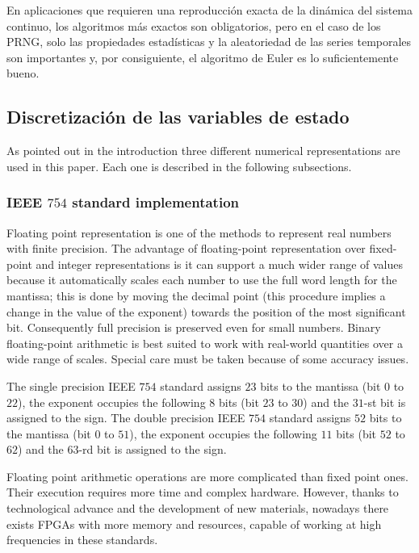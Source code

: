 En aplicaciones que requieren una reproducción exacta de la dinámica del sistema continuo, los algoritmos más exactos son obligatorios, pero en el caso de los PRNG, solo las propiedades estadísticas y la aleatoriedad de las series temporales son importantes y, por consiguiente, el algoritmo de Euler es lo suficientemente bueno.

\subsection{Discretización de las variables de estado}
\label{sec:numrepre}

As pointed out in the introduction three different numerical representations are used in this paper.
Each one is described in the following subsections.

\subsubsection{IEEE $754$ standard implementation}
\label{sec:impleFloat}

Floating point representation is one of the methods to represent real numbers with finite precision.
The advantage of floating-point representation over fixed-point and integer representations is it can support a much wider range of values because it automatically scales each number to use the full word length for the mantissa; this is done by moving the decimal point (this procedure implies a change in the value of the exponent) towards the position of the most significant bit.
Consequently full precision is preserved even for small numbers.
Binary floating-point arithmetic is best suited to work  with real-world quantities over a wide range of scales. 
Special care must be taken because of some accuracy issues.

The single precision IEEE $754$ standard assigns $23$ bits to the mantissa (bit $0$ to $22$), the exponent occupies the following $8$ bits (bit $23$ to $30$) and the $31$-st bit is assigned to the sign.
The double precision IEEE $754$ standard assigns $52$ bits to the mantissa (bit $0$ to $51$), the exponent occupies the following $11$ bits (bit $52$ to $62$) and the $63$-rd bit is assigned to the sign.

Floating point arithmetic operations are more complicated than fixed point ones.
Their execution requires more time and complex hardware.
However, thanks to technological advance and the development of new materials, nowadays there exists FPGAs with more memory and resources, capable of working at high frequencies in these standards.

